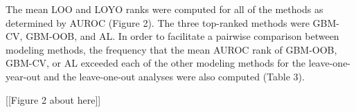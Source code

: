 \documentclass[authoryear,review, 12pt]{elsarticle}
\begin{document}
The mean LOO and LOYO ranks were computed for all of the methods as
determined by AUROC (Figure 2). The three top-ranked methods were
GBM-CV, GBM-OOB, and AL. In order to facilitate a pairwise comparison
between modeling methods, the frequency that the mean AUROC rank of
GBM-OOB, GBM-CV, or AL exceeded each of the other modeling methods for
the leave-one-year-out and the leave-one-out analyses were also computed
(Table 3).

[[Figure 2 about here]]

\begin{table}
\end{table}
\end{document}
